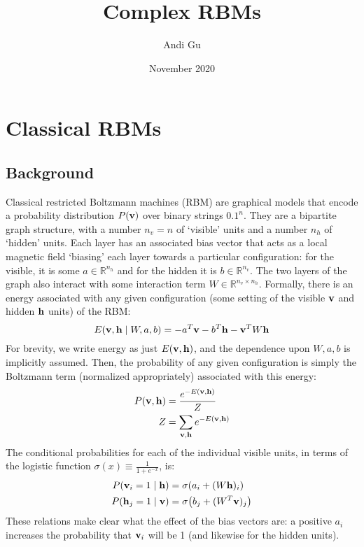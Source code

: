 \documentclass{article}
\title{Complex RBMs}
\author{Andi Gu}
\date{November 2020}
\begin{document}
\maketitle

\section{Classical RBMs}
\subsection{Background}
Classical restricted Boltzmann machines (RBM) are graphical models that encode a probability distribution $P(\vb{v})$ over binary strings $\qty{0,1}^n$. They are a bipartite graph structure, with a number $n_v=n$ of `visible' units and a number $n_h$ of `hidden' units. Each layer has an associated bias vector that acts as a local magnetic field `biasing' each layer towards a particular configuration: for the visible, it is some $a \in \mathbb{R}^{n_h}$ and for the hidden it is $b \in \mathbb{R}^{n_v}$. The two layers of the graph also interact with some interaction term $W \in \mathbb{R}^{n_v \times n_h}$. Formally, there is an energy associated with any given configuration (some setting of the visible $\vb{v}$ and hidden $\vb{h}$ units) of the RBM:
\begin{equation}
    E(\vb{v},\vb{h} \mid W, a, b) = -a^T \vb{v} - b^T \vb{h} - \vb{v}^T W \vb{h}
\end{equation}
For brevity, we write energy as just $E(\vb{v},\vb{h})$, and the dependence upon $W,a,b$ is implicitly assumed. Then, the probability of any given configuration is simply the Boltzmann term (normalized appropriately) associated with this energy:
\begin{align}
    P(\vb{v}, \vb{h}) &= \frac{e^{-E(\vb{v},\vb{h})}}{Z} \\
    Z &= \sum_{\vb{v},\vb{h}} e^{-E(\vb{v},\vb{h})}
\end{align}
The conditional probabilities for each of the individual visible units, in terms of the logistic function $\sigma(x) \equiv \frac{1}{1+e^{-x}}$, is:
\begin{align}
    P(\vb{v}_i = 1 \mid \vb{h}) &= \sigma\qty(a_i + (W\vb{h})_i) \label{condv} \\
    P(\vb{h}_j = 1 \mid \vb{v}) &= \sigma\qty(b_j + (W^T\vb{v})_j) \label{condh}
\end{align}
These relations make clear what the effect of the bias vectors are: a positive $a_i$ increases the probability that $\vb{v}_i$ will be 1 (and likewise for the hidden units).
\end{document}
